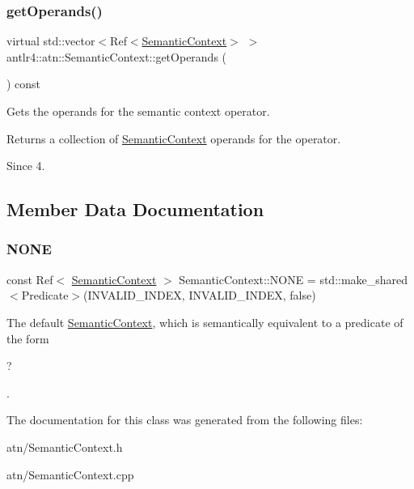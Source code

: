 \subsubsection{\texorpdfstring{get\+Operands()}{getOperands()}}
{\footnotesize\ttfamily virtual std\+::vector$<$Ref$<$\hyperlink{classantlr4_1_1atn_1_1SemanticContext}{Semantic\+Context}$>$ $>$ antlr4\+::atn\+::\+Semantic\+Context\+::get\+Operands (\begin{DoxyParamCaption}{ }\end{DoxyParamCaption}) const\hspace{0.3cm}{\ttfamily [pure virtual]}}

Gets the operands for the semantic context operator.

\begin{DoxyReturn}{Returns}
a collection of \hyperlink{classantlr4_1_1atn_1_1SemanticContext}{Semantic\+Context} operands for the operator.
\end{DoxyReturn}
\begin{DoxySince}{Since}
4. 
\end{DoxySince}


\subsection{Member Data Documentation}
\mbox{\label{classantlr4_1_1atn_1_1SemanticContext_a1c9db994b89d06e9d8969e78050aeff5}} 
\subsubsection{\texorpdfstring{N\+O\+NE}{NONE}}
{\footnotesize\ttfamily const Ref$<$ \hyperlink{classantlr4_1_1atn_1_1SemanticContext}{Semantic\+Context} $>$ Semantic\+Context\+::\+N\+O\+NE = std\+::make\+\_\+shared$<$Predicate$>$(I\+N\+V\+A\+L\+I\+D\+\_\+\+I\+N\+D\+EX, I\+N\+V\+A\+L\+I\+D\+\_\+\+I\+N\+D\+EX, false)\hspace{0.3cm}{\ttfamily [static]}}

The default \hyperlink{classantlr4_1_1atn_1_1SemanticContext}{Semantic\+Context}, which is semantically equivalent to a predicate of the form
\begin{DoxyCode}
? 
\end{DoxyCode}
 . 

The documentation for this class was generated from the following files\+:\begin{DoxyCompactItemize}
\item 
atn/Semantic\+Context.\+h\item 
atn/Semantic\+Context.\+cpp\end{DoxyCompactItemize}
